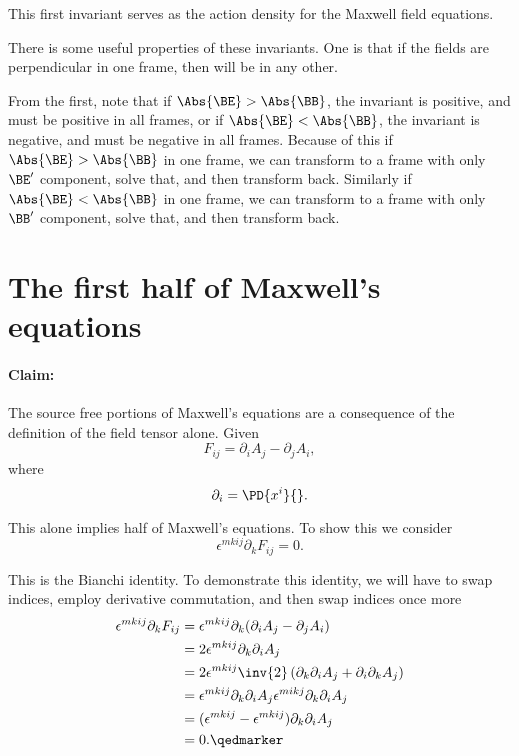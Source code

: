 This first invariant serves as the action density for the Maxwell field equations.

There is some useful properties of these invariants.  One is that if the fields are perpendicular in one frame, then will be in any other.

From the first, note that if \(\Abs{\BE} > \Abs{\BB}\), the invariant is positive, and must be positive in all frames, or if \(\Abs{\BE} < \Abs{\BB}\), the invariant is negative, and must be negative in all frames.  Because of this if \(\Abs{\BE} > \Abs{\BB}\) in one frame, we can transform to a frame with only \(\BE'\) component, solve that, and then transform back.  Similarly if \(\Abs{\BE} < \Abs{\BB}\) in one frame, we can transform to a frame with only \(\BB'\) component, solve that, and then transform back.

\section{The first half of Maxwell's equations}
%
\paragraph{Claim: } The source free portions of Maxwell's equations are a consequence of the definition of the field tensor alone.
Given
\begin{equation}\label{eqn:relativisticElectrodynamicsL11:670}
F_{i j} = \partial_i A_j - \partial_j A_i,
\end{equation}
where
\begin{equation}\label{eqn:relativisticElectrodynamicsL11:690}
\partial_i = \PD{x^i}{}.
\end{equation}

This alone implies half of Maxwell's equations.  To show this we consider
%
\begin{equation}\label{eqn:relativisticElectrodynamicsL11:710}
\epsilon^{m k i j} \partial_k F_{i j} = 0.
\end{equation}

This is the Bianchi identity.  To demonstrate this identity, we will have to swap indices, employ derivative commutation, and then swap indices once more
%
\begin{equation}\label{eqn:relativisticElectrodynamicsL11b:1380}
\begin{aligned}
\epsilon^{m k i j} \partial_k F_{i j}
&= \epsilon^{m k i j} \partial_k (\partial_i A_j - \partial_j A_i) \\
&= 2 \epsilon^{m k i j} \partial_k \partial_i A_j \\
&= 2 \epsilon^{m k i j} \inv{2} \left( \partial_k \partial_i A_j + \partial_i \partial_k A_j \right) \\
&=
\epsilon^{m k i j} \partial_k \partial_i A_j
\epsilon^{m i k j} \partial_k \partial_i A_j  \\
&=
(\epsilon^{m k i j} - \epsilon^{m k i j}) \partial_k \partial_i A_j \\
&= 0. \qedmarker
\end{aligned}
\end{equation}

